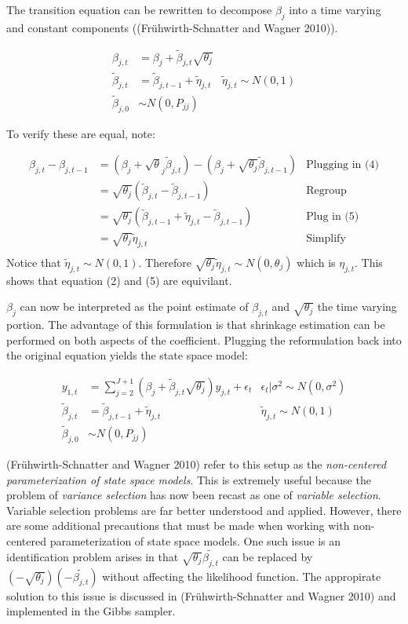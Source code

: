 \documentclass[
]{article}
\begin{document}
The transition equation can be rewritten to decompose \(\beta_j\) into a
time varying and constant components ((Frühwirth-Schnatter and Wagner
2010)).

\begin{align}
\beta_{j,t}&=\beta_{j}+\tilde{\beta}_{j,t}\sqrt{\theta_j}\\
\tilde{\beta}_{j,t}&= \tilde{\beta}_{j,t-1}+\tilde{\eta}_{j,t} & \tilde{\eta}_{j,t} \sim N(0,1)\\
\tilde{\beta}_{j,0}& \sim N(0,P_{jj})
\end{align}

To verify these are equal, note:

\[
\begin{aligned}
\beta_{j,t}-\beta_{j,t-1}&=(\beta_j + \sqrt\theta_j \tilde{\beta}_{j,t})-(\beta_j + \sqrt{\theta_j}\tilde{\beta}_{j,{t-1}}) & \text{Plugging in (4)}\\
& =\sqrt{\theta_j}(\tilde{\beta}_{j,t}-\tilde{\beta}_{j,t-1}) & \text{Regroup}\\
&= \sqrt{\theta_j}(\tilde{\beta}_{j,t-1}+\tilde{\eta}_{j,t}-\tilde{\beta}_{j,t-1}) & \text{Plug in (5)}\\
&= \sqrt{\theta_j}\tilde{\eta}_{j,t} & \text{Simplify}\\
\end{aligned}
\] Notice that \(\tilde{\eta}_{j,t} \sim N(0,1)\). Therefore
\(\sqrt{\theta_j}\tilde{\eta}_{j,t} \sim N(0,\theta_j)\) which is
\(\eta_{j,t}\). This shows that equation (2) and (5) are equivilant.

\(\beta_j\) can now be interpreted as the point estimate of
\(\beta_{j,t}\) and \(\sqrt{\theta_j}\) the time varying portion. The
advantage of this formulation is that shrinkage estimation can be
performed on both aspects of the coefficient. Plugging the reformulation
back into the original equation yields the state space model:

\[
\begin{aligned}
y_{1,t}&= \sum_{j=2}^{J+1} \left(\beta_{j}+\tilde{\beta}_{j,t}\sqrt{\theta_j}\right)y_{j,t}+\epsilon_t & \epsilon_t|\sigma^2 \sim N(0, \sigma^2)\\
\tilde{\beta}_{j,t}&= \tilde{\beta}_{j,t-1}+\tilde{\eta}_{j,t} & \tilde{\eta}_{j,t} \sim N(0,1)\\
\tilde{\beta}_{j,0}& \sim N(0,P_{jj})
\end{aligned}
\]

(Frühwirth-Schnatter and Wagner 2010) refer to this setup as the
\emph{non-centered parameterization of state space models}. This is
extremely useful because the problem of \emph{variance selection} has
now been recast as one of \emph{variable selection}. Variable selection
problems are far better understood and applied. However, there are some
additional precautions that must be made when working with non-centered
parameterization of state space models. One such issue is an
identification problem arises in that
\(\sqrt{\theta_j}\tilde{\beta_{j,t}}\) can be replaced by
\((-\sqrt{\theta_j})(-\tilde{\beta_{j,t}})\) without affecting the
likelihood function. The appropirate solution to this issue is discussed
in (Frühwirth-Schnatter and Wagner 2010) and implemented in the Gibbs
sampler.
\end{document}
